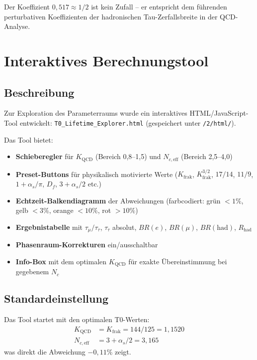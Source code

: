 	Der Koeffizient $0{,}517 \approx 1/2$ ist kein Zufall -- er entspricht dem führenden perturbativen Koeffizienten der hadronischen Tau-Zerfallsbreite in der QCD-Analyse.
	
	
	\section{Interaktives Berechnungstool}
	
	\subsection{Beschreibung}
	
	Zur Exploration des Parameterraums wurde ein interaktives HTML/JavaScript-Tool entwickelt: \texttt{T0\_Lifetime\_Explorer.html} (gespeichert unter \texttt{/2/html/}).
	
	Das Tool bietet:
	\begin{itemize}
		\item \textbf{Schieberegler} für $K_\text{QCD}$ (Bereich 0,8--1,5) und $N_{c,\text{eff}}$ (Bereich 2,5--4,0)
		\item \textbf{Preset-Buttons} für physikalisch motivierte Werte ($K_\text{frak}$, $K_\text{frak}^{3/2}$, $17/14$, $11/9$, $1+\alpha_s/\pi$, $D_f$, $3+\alpha_s/2$ etc.)
		\item \textbf{Echtzeit-Balkendiagramm} der Abweichungen (farbcodiert: grün $<1\%$, gelb $<3\%$, orange $<10\%$, rot $>10\%$)
		\item \textbf{Ergebnistabelle} mit $\tau_\mu/\tau_\tau$, $\tau_\tau$ absolut, $BR(e)$, $BR(\mu)$, $BR(\text{had})$, $R_\text{had}$
		\item \textbf{Phasenraum-Korrekturen} ein/ausschaltbar
		\item \textbf{Info-Box} mit dem optimalen $K_\text{QCD}$ für exakte Übereinstimmung bei gegebenem $N_c$
	\end{itemize}
	
	\subsection{Standardeinstellung}
	
	Das Tool startet mit den optimalen T0-Werten:
	\begin{align}
		K_\text{QCD} &= K_\text{frak} = 144/125 = 1{,}1520 \\
		N_{c,\text{eff}} &= 3 + \alpha_s/2 = 3{,}165
	\end{align}
	was direkt die Abweichung $-0{,}11\%$ zeigt.
	
